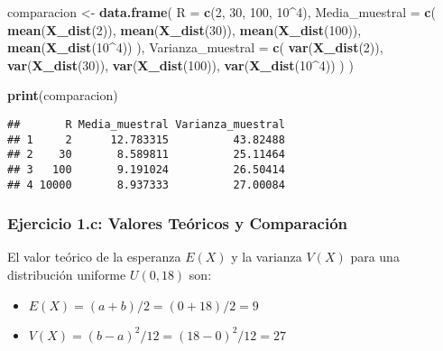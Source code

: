 \documentclass[
]{article}
\newenvironment{Shaded}{\begin{snugshade}}{\end{snugshade}}
\newcommand{\AttributeTok}[1]{\textcolor[rgb]{0.13,0.29,0.53}{#1}}
\newcommand{\DecValTok}[1]{\textcolor[rgb]{0.00,0.00,0.81}{#1}}
\newcommand{\FunctionTok}[1]{\textcolor[rgb]{0.13,0.29,0.53}{\textbf{#1}}}
\newcommand{\NormalTok}[1]{#1}
\newcommand{\OtherTok}[1]{\textcolor[rgb]{0.56,0.35,0.01}{#1}}
\newcommand{\SpecialCharTok}[1]{\textcolor[rgb]{0.81,0.36,0.00}{\textbf{#1}}}
\begin{document}
\begin{Shaded}
\begin{Highlighting}[]
\NormalTok{comparacion }\OtherTok{\textless{}{-}} \FunctionTok{data.frame}\NormalTok{(}
  \AttributeTok{R =} \FunctionTok{c}\NormalTok{(}\DecValTok{2}\NormalTok{, }\DecValTok{30}\NormalTok{, }\DecValTok{100}\NormalTok{, }\DecValTok{10}\SpecialCharTok{\^{}}\DecValTok{4}\NormalTok{), }
    \AttributeTok{Media\_muestral =} \FunctionTok{c}\NormalTok{(}
    \FunctionTok{mean}\NormalTok{(}\FunctionTok{X\_dist}\NormalTok{(}\DecValTok{2}\NormalTok{)),}
    \FunctionTok{mean}\NormalTok{(}\FunctionTok{X\_dist}\NormalTok{(}\DecValTok{30}\NormalTok{)),}
    \FunctionTok{mean}\NormalTok{(}\FunctionTok{X\_dist}\NormalTok{(}\DecValTok{100}\NormalTok{)),}
    \FunctionTok{mean}\NormalTok{(}\FunctionTok{X\_dist}\NormalTok{(}\DecValTok{10}\SpecialCharTok{\^{}}\DecValTok{4}\NormalTok{))}
\NormalTok{  ),}
  \AttributeTok{Varianza\_muestral =} \FunctionTok{c}\NormalTok{(}
    \FunctionTok{var}\NormalTok{(}\FunctionTok{X\_dist}\NormalTok{(}\DecValTok{2}\NormalTok{)),}
    \FunctionTok{var}\NormalTok{(}\FunctionTok{X\_dist}\NormalTok{(}\DecValTok{30}\NormalTok{)),}
    \FunctionTok{var}\NormalTok{(}\FunctionTok{X\_dist}\NormalTok{(}\DecValTok{100}\NormalTok{)),}
    \FunctionTok{var}\NormalTok{(}\FunctionTok{X\_dist}\NormalTok{(}\DecValTok{10}\SpecialCharTok{\^{}}\DecValTok{4}\NormalTok{))}
\NormalTok{  )}
\NormalTok{)}

\FunctionTok{print}\NormalTok{(comparacion)}
\end{Highlighting}
\end{Shaded}

\begin{verbatim}
##       R Media_muestral Varianza_muestral
## 1     2      12.783315          43.82488
## 2    30       8.589811          25.11464
## 3   100       9.191024          26.50414
## 4 10000       8.937333          27.00084
\end{verbatim}

\subsubsection{Ejercicio 1.c: Valores Teóricos y
Comparación}\label{ejercicio-1.c-valores-teuxf3ricos-y-comparaciuxf3n}

El valor teórico de la esperanza \(E(X)\) y la varianza \(V(X)\) para
una distribución uniforme \(U(0,18)\) son:

\begin{itemize}
\item
  \(E(X) = (a + b) / 2 = (0 + 18) / 2 = 9\)
\item
  \(V(X) = (b - a)^2 / 12 = (18 − 0)^2 / 12 = 27\)
\end{itemize}
\end{document}
